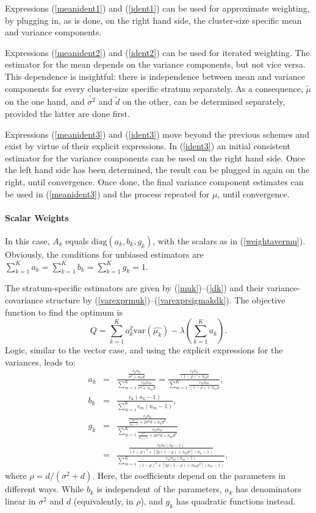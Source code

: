 \documentclass[11pt,a5paper,twoside]{book}
\let\oldparagraph\paragraph
\renewcommand{\paragraph}[1]{\oldparagraph{#1}\mbox{}}
\begin{document}
Expressions (\ref{meanident1}) and (\ref{ident1}) can be 
used for approximate weighting, by plugging in, as is done, 
on the right hand side, the cluster-size specific mean and 
variance components.

Expressions (\ref{meanident2}) and (\ref{ident2}) can be used 
for iterated weighting. 
The estimator for the mean depends on the variance 
components, but not vice versa. This dependence is insightful: 
there is independence between mean and variance components for 
every cluster-size specific stratum separately. As a consequence, 
$\widetilde{\mu}$ on the one hand, and $\widetilde{\sigma^2}$ and 
$\widetilde{d}$ on the other, can be determined separately, 
provided the latter are done first.

Expressions (\ref{meanident3}) and (\ref{ident3}) move beyond 
the previous schemes and exist by virtue of their explicit 
expressions. In (\ref{ident3}) an initial consistent estimator 
for the variance components can be used on the right hand side. 
Once the left hand side has been determined, the result can be 
plugged in again on the right, until convergence. Once done, 
the final variance component estimates can be used in 
(\ref{meanident3}) and the process repeated for $\mu$, 
until convergence.

\paragraph{Scalar Weights}\label{scalarcs}

In this case, $A_k$ equals $\mbox{diag}(a_k,b_k,g_k)$, with 
the scalars as in
(\ref{weightavermu}). Obviously, the 
conditions for  unbiased estimators are 
$\sum_{k=1}^Ka_k=\sum_{k=1}^Kb_k=\sum_{k=1}^Kg_k=1$.

The stratum-specific estimators are given by (\ref{muk})--(\ref{dk}) 
and their variance-covariance structure by  
(\ref{varexprmuk})--(\ref{varexprsigmakdk}). 
The objective function to find the optimum is
$$Q=\sum_{k=1}^Ka_k^2\mbox{var}(\widehat{\mu_k})-\lambda\left(\sum_{k=1}^Ka_k\right).$$
Logic, similar to the vector case, and using the explicit 
expressions for the variances, leads to:
\begin{eqnarray}
\label{akbasic}
a_k&=&\frac
{
\frac{c_kn_k}{\sigma^2+n_kd}
}
{
\sum_{m=1}^K\frac{c_mn_m}{\sigma^2+n_md}
}
=
\frac
{
\frac{c_kn_k}{(1-\rho)+n_k\rho}
}
{
\sum_{m=1}^K\frac{c_mn_m}{(1-\rho)+n_m\rho}
}
,\\[2mm]
\label{bkbasic}
b_k&=&\frac
{
c_k(n_k-1)
}
{
\sum_{m=1}^Kc_m(n_m-1)
},\\[2mm]
\label{gkbasic}
g_k&=&\frac
{
\frac{c_kn_k}{\frac{\sigma^4}{n_k-1}+2\sigma^2d+n_kd^2}
}
{
\sum_{m=1}^K
\frac{c_mn_m}{\frac{\sigma^4}{n_m-1}+2\sigma^2d+n_md^2}
}\\[2mm]
&=&
\frac
{
\frac{c_kn_k(n_k-1)}{(1-\rho)^2+[2\rho(1-\rho)+n_k\rho^2](n_k-1)}
}
{
\sum_{m=1}^K
\frac{c_mn_m(n_m-1)}{(1-\rho)^2+[2\rho(1-\rho)+n_m\rho^2](n_m-1)}
}
,
\end{eqnarray}
where $\rho=d/(\sigma^2+d)$.
Here, the coefficients depend on 
the parameters in different ways. While $b_k$ is independent of 
the parameters, $a_k$ has denominators linear in $\sigma^2$ and 
$d$ (equivalently, in $\rho$), and $g_k$ has quadratic functions instead.
\end{document}
